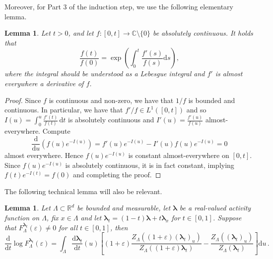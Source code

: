 \documentclass[10pt]{amsart}
\newtheorem{lemma}[theorem]{Lemma}
\theoremstyle{definition}
\theoremstyle{remark}
\newcommand{\R}{\mathbb{R}}
\newcommand{\C}{\mathbb{C}}
\newcommand{\region}{\Lambda}
\newcommand{\activities}{\pmb{\lambda}}
\newcommand{\diff}{\mathrm{d}}
\begin{document}
	Moreover, for Part 3 of the induction step, we use the following elementary lemma. 
	\begin{lemma}
		\label{lemma:ftc} Let $t > 0$, and let
		$f\colon [0, t] \to \C \setminus \{0\}$ be absolutely continuous.  It holds
		that
		\begin{equation*}
			\frac{f(t)}{f(0)} = \exp\left(\int_{0}^{t} \frac{f'(s)}{f(s)} \diff s \right),
		\end{equation*}
		where the integral should be understood as a Lebesgue integral and $f'$ is almost everywhere a derivative of $f$.
	\end{lemma}
	\begin{proof}
		Since $f$ is continuous and non-zero, we have that $1/f$ is bounded and continuous.  In particular,  we have that $f'/f \in L^1([0,t])$ and so $I(u) = \int_0^u\frac{f'(t)}{f(t)}\,\diff t$ is absolutely continuous and $I'(u) = \frac{f'(u)}{f(u)}$ almost-everywhere.  Compute $$\frac{\diff}{\diff u}\left(f(u) e^{-I(u)} \right) = f'(u) e^{-I(u)} - I'(u) f(u) e^{-I(u)} = 0$$
		almost everywhere.  Hence $f(u) e^{-I(u)}$ is constant almost-everywhere on $[0,t]$.  Since $f(u) e^{-I(u)}$ is absolutely continuous, it is in fact constant, implying $f(t) e^{-I(t)} = f(0)$ and completing the proof.
	\end{proof}
	
	The following technical lemma will also be relevant.
	
	\begin{lemma} \label{lemma:integral_identity}
		Let $\region \subset \R^d$ be bounded and measurable, let $\activities$ be a real-valued activity function on $\Lambda$, fix $x\in \Lambda$ and let $\activities_t=(1-t)\activities+t \activities_x$ for $t\in[0,1]$. Suppose that $F_{\region}^{\activities_t}(\varepsilon)\neq0$ for all $t\in [0,1]$, then
		\[
		\frac{\diff}{\diff t}\log F_\region^{\activities_t}(\varepsilon)
		=
		\int_\region \frac{\diff\activities_t}{\diff t}(u)
		\left[
		(1+\varepsilon)
		\frac{Z_\region((1+\varepsilon)(\activities_t)_u)}
		{Z_\region((1+\varepsilon)\activities_t)}
		-
		\frac{Z_\region((\activities_t)_u)}
		{Z_\region(\activities_t)}
		\right]
		\diff u\, .
		\]
	\end{lemma}
	
	
	
\end{document}
